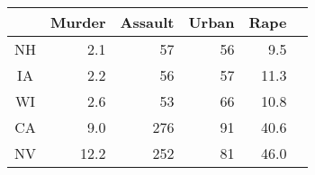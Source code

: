 \begin{tabular}{crrrrr}
\midrule   & Murder & Assault & Urban & Rape \\  \midrule
  NH & 2.1 & 57 & 56 & 9.5 \\ 
  IA & 2.2 & 56 & 57 & 11.3 \\ 
  WI & 2.6 & 53 & 66 & 10.8 \\ 
  CA & 9.0 & 276 & 91 & 40.6 \\ 
  NV & 12.2 & 252 & 81 & 46.0 \\ 
  \end{tabular} 
